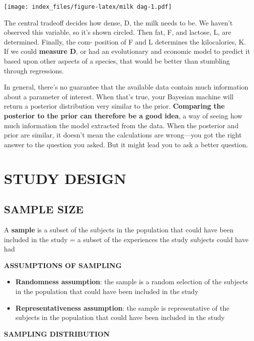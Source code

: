 \documentclass[
]{article}
\begin{document}
\texttt{[image: index\_files/figure-latex/milk dag-1.pdf]}

The central tradeoff decides how dense, D, the milk needs to be. We
haven't observed this variable, so it's shown circled. Then fat, F, and
lactose, L, are determined. Finally, the com- position of F and L
determines the kilocalories, K. If we could \textbf{measure D}, or had
an evolutionary and economic model to predict it based upon other
aspects of a species, that would be better than stumbling through
regressions.

In general, there's no guarantee that the available data contain much
information about a parameter of interest. When that's true, your
Bayesian machine will return a posterior distribution very similar to
the prior. \textbf{Comparing the posterior to the prior can therefore be
a good idea}, a way of seeing how much information the model extracted
from the data. When the posterior and prior are similar, it doesn't mean
the calculations are wrong---you got the right answer to the question
you asked. But it might lead you to ask a better question.

\hypertarget{study-design}{%
\section{\texorpdfstring{\textbf{STUDY
DESIGN}}{STUDY DESIGN}}\label{study-design}}

\hypertarget{sample-size}{%
\subsection{SAMPLE SIZE}\label{sample-size}}

A \textbf{sample} is a subset of the subjects in the population that
could have been included in the study = a subset of the experiences the
study subjects could have had

\textbf{ASSUMPTIONS OF SAMPLING}

\begin{itemize}
\item
  \textbf{Randomness assumption}: the sample is a random selection of
  the subjects in the population that could have been included in the
  study
\item
  \textbf{Representativeness assumption}: the sample is representative
  of the subjects in the population that could have been included in the
  study
\end{itemize}

\textbf{SAMPLING DISTRIBUTION}
\end{document}
